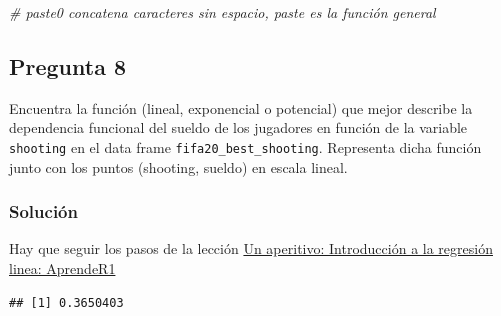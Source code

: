 \documentclass[]{article}
\newenvironment{Shaded}{\begin{snugshade}}{\end{snugshade}}
\newcommand{\CommentTok}[1]{\textcolor[rgb]{0.56,0.35,0.01}{\textit{#1}}}
\newcommand{\DataTypeTok}[1]{\textcolor[rgb]{0.13,0.29,0.53}{#1}}
\newcommand{\KeywordTok}[1]{\textcolor[rgb]{0.13,0.29,0.53}{\textbf{#1}}}
\newcommand{\NormalTok}[1]{#1}
\newcommand{\OperatorTok}[1]{\textcolor[rgb]{0.81,0.36,0.00}{\textbf{#1}}}
\begin{document}
\begin{Shaded}
\begin{Highlighting}[]
\CommentTok{# paste0  concatena  caracteres sin espacio, paste es la función general}
\end{Highlighting}
\end{Shaded}

\hypertarget{pregunta-8}{%
\subsection{Pregunta 8}\label{pregunta-8}}

Encuentra la función (lineal, exponencial o potencial) que mejor
describe la dependencia funcional del sueldo de los jugadores en función
de la variable \texttt{shooting} en el data frame
\texttt{fifa20\_best\_shooting}. Representa dicha función junto con los
puntos (shooting, sueldo) en escala lineal.

\hypertarget{soluciuxf3n-7}{%
\subsubsection{Solución}\label{soluciuxf3n-7}}

Hay que seguir los pasos de la lección
\href{https://aprender-uib.github.io/AprendeR1/chap-lm.html}{Un
aperitivo: Introducción a la regresión linea: AprendeR1}

\begin{Shaded}
\end{Shaded}

\begin{verbatim}
## [1] 0.3650403
\end{verbatim}

\begin{Shaded}
\end{Shaded}
\end{document}
